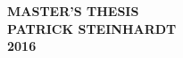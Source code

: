 \documentclass[a4paper]{article}
\begin{document}
        \thispagestyle{empty}

        \begin{center}
                \vspace*{3cm}
                {\LARGE\bfseries MASTER'S THESIS}\\
                \vspace*{6cm}
                {\LARGE\bfseries PATRICK STEINHARDT}\\
                \vspace*{1.5cm}
                {\LARGE\bfseries 2016}
        \end{center}
\end{document}
